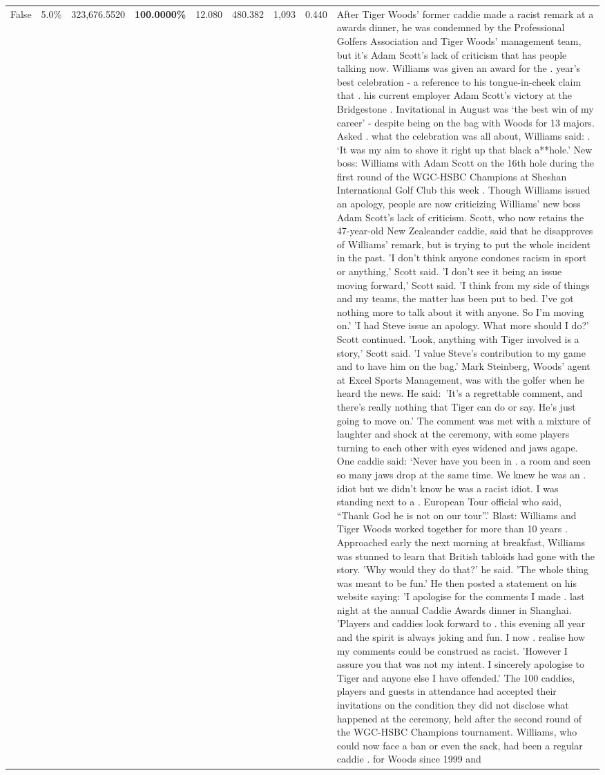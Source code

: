 \begin{table}[H]
\begin{tabular}{lllrlllll}
False & 5.0\% & 323,676.5520 & \bfseries \color{red} 100.0000\% & 12.080 & 480.382 & 1,093 & 0.440 & After Tiger Woods' former caddie made a racist remark at a awards dinner, he was condemned by the Professional Golfers Association and Tiger Woods' management team, but it's Adam Scott's lack of criticism that has people talking now. Williams was given an award for the . year’s best celebration - a reference to his tongue-in-cheek claim that . his current employer Adam Scott’s victory at the Bridgestone . Invitational in August was ‘the best win of my career’ - despite being on the bag with Woods for 13 majors. Asked . what the celebration was all about, Williams said: . ‘It was my aim to shove it right up that black a**hole.’ New boss: Williams with Adam Scott  on the 16th hole during the first round of the WGC-HSBC Champions at Sheshan International Golf Club this week . Though Williams issued an apology, people are now criticizing Williams' new boss Adam Scott's lack of criticism. Scott, who now retains the 47-year-old New Zealeander caddie, said that he disapproves of Williams' remark, but is trying to put the whole incident in the past. 'I don't think anyone condones racism in sport or anything,' Scott said. 'I don't see it being an issue moving forward,' Scott said. 'I think from my side of things and my teams, the matter has been put to bed. I've got nothing more to talk about it with anyone. So I'm moving on.' 'I had Steve issue an apology. What more should I do?' Scott continued. 'Look, anything with Tiger involved is a story,' Scott said. 'I value Steve's contribution to my game and to have him on the bag.' Mark Steinberg, Woods' agent at Excel Sports Management, was with the golfer when he heard the news. He said: 'It's a regrettable comment, and there's really nothing that Tiger can do or say. He's just going to move on.' The comment was met with a mixture of laughter and shock at the ceremony, with some players turning to each other with eyes widened and jaws agape. One caddie said: ‘Never have you been in . a room and seen so many jaws drop at the same time. We knew he was an . idiot but we didn’t know he was a racist idiot. I was standing next to a . European Tour official who said, “Thank God he is not on our tour”.’ Blast: Williams and Tiger Woods worked together for more than 10 years . Approached early the next morning at breakfast, Williams was stunned to learn that British tabloids had gone with the story. 'Why would they do that?' he said. 'The whole thing was meant to be fun.' He then posted a statement on his website saying: 'I apologise for the comments I made . last night at the annual Caddie Awards dinner in Shanghai. 'Players and caddies look forward to . this evening all year and the spirit is always joking and fun. I now . realise how my comments could be construed as racist. 'However I assure you that was not my intent. I sincerely apologise to Tiger and anyone else I have offended.' The 100 caddies, players and guests in attendance had accepted their invitations on the condition they did not disclose what happened at the ceremony, held after the second round of the WGC-HSBC Champions tournament. Williams, who could now face a ban or even the sack, had been a regular caddie . for Woods since 1999 and 
\end{tabular}
\end{table}
